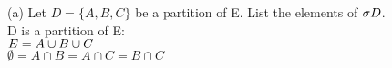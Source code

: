 (a) Let $D = \{A, B, C\}$  be a partition of E. List the elements of  $\sigma D $. \\
D is a partition of E:\\
$ E = A \cup B \cup C $ \\
$\emptyset = A \cap B = A \cap C = B \cap C$

